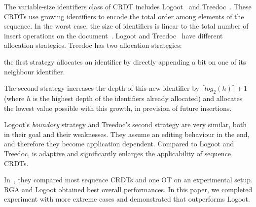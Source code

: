 The variable-size identifiers class of CRDT includes
Logoot~\cite{weiss2009logoot} and Treedoc~\cite{preguica2009commutative}. These
CRDTs use growing identifiers to encode the total order among elements of the
sequence. In the worst case, the size of identifiers is linear to the total
number of insert operations on the document~\cite{ahmed2011evaluating}. Logoot
and Treedoc~\cite{preguica2009commutative} have different allocation
strategies. Treedoc has two allocation strategies:
\begin{inparaenum}[(i)]
\item the first strategy allocates an identifier by directly appending a bit on
  one of its neighbour identifier.
\item The second strategy increases the depth of this new identifier by $\lceil
  log_2(h)\rceil +1 $ (where $h$ is the highest depth of the identifiers
  already allocated) and allocates the lowest value possible with this growth,
  in prevision of future insertions.
\end{inparaenum}

Logoot's \emph{boundary} strategy and Treedoc's second strategy are very
similar, both in their goal and their weaknesses. They assume an editing
behaviour in the end, and therefore they become application dependent.
Compared to Logoot and Treedoc, \NAME{} is adaptive and significantly enlarges
the applicability of sequence CRDTs.

In~\cite{ahmed2011evaluating}, they compared most sequence CRDTs and one OT on
an experimental setup. RGA and Logoot obtained best overall performances. In
this paper, we completed experiment with more extreme cases and demonstrated
that \NAME{} outperforms Logoot.

